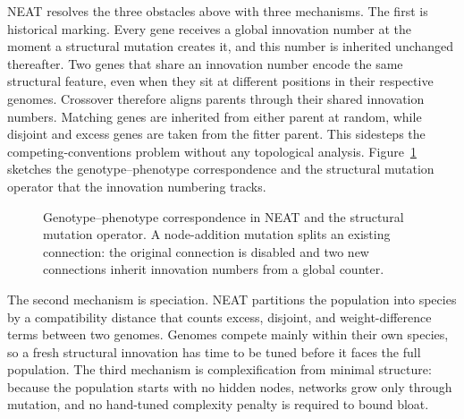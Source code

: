 \documentclass[12pt]{article}
\begin{document}
NEAT resolves the three obstacles above with three mechanisms.
The first is historical marking.
Every gene receives a global innovation number at the moment a structural mutation creates it, and this number is inherited unchanged thereafter.
Two genes that share an innovation number encode the same structural feature, even when they sit at different positions in their respective genomes.
Crossover therefore aligns parents through their shared innovation numbers.
Matching genes are inherited from either parent at random, while disjoint and excess genes are taken from the fitter parent.
This sidesteps the competing-conventions problem without any topological analysis.
Figure~\ref{fig:genotype-phenotype} sketches the genotype--phenotype correspondence and the structural mutation operator that the innovation numbering tracks.

\begin{figure}[h]
\centering
{}
\caption{Genotype--phenotype correspondence in NEAT and the structural mutation operator. A node-addition mutation splits an existing connection: the original connection is disabled and two new connections inherit innovation numbers from a global counter.}
\label{fig:genotype-phenotype}
\end{figure}

The second mechanism is speciation.
NEAT partitions the population into species by a compatibility distance that counts excess, disjoint, and weight-difference terms between two genomes.
Genomes compete mainly within their own species, so a fresh structural innovation has time to be tuned before it faces the full population.
The third mechanism is complexification from minimal structure: because the population starts with no hidden nodes, networks grow only through mutation, and no hand-tuned complexity penalty is required to bound bloat.

\end{document}
